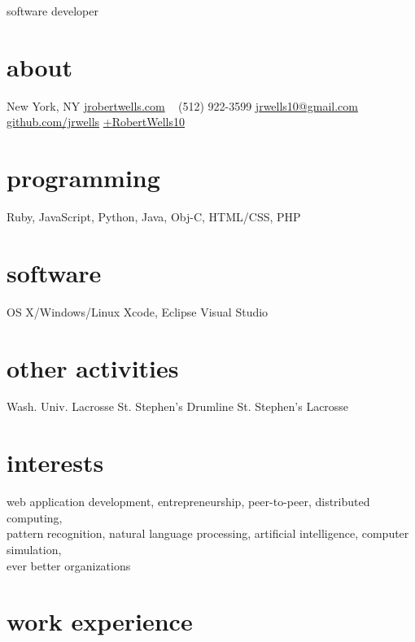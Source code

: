 \documentclass[]{cv}
\begin{document}
       {software developer}

\begin{aside}
  \section{about}
    {New York, NY}
    \href{http://jrobertwells.com}{jrobertwells.com}
    ~
    (512) 922-3599
    \href{mailto:jrwells10@gmail.com}{jrwells10@gmail.com}
    ~
    \href{http://github.com/jrwells}{github.com/jrwells}
    \href{http://google.com/+RobertWells10}{+RobertWells10}
  \section{programming}
    Ruby, JavaScript,
    Python, Java, Obj-C,
    HTML/CSS, PHP
  \section{software}
    OS X/Windows/Linux
    Xcode, Eclipse
    Visual Studio
  \section{other activities}
    Wash. Univ. Lacrosse
    St. Stephen's Drumline
    St. Stephen's Lacrosse
\end{aside}

\section{interests}

web application development, entrepreneurship, peer-to-peer, distributed computing, \\
pattern recognition, natural language processing, artificial intelligence, computer simulation, \\
ever better organizations

\section{work experience}
\end{document}
